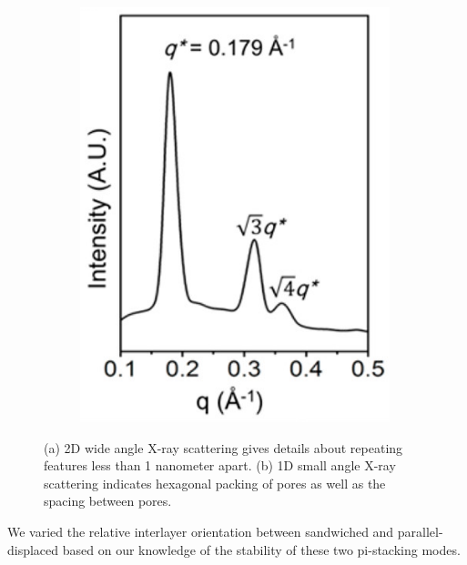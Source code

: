 \documentclass{article}
\begin{document}
\begin{figure}[ht]
\begin{subfigure}[t]{0.43\linewidth}
		\includegraphics[width=\linewidth]{SAXS.png}
		\caption{}\label{fig:SAXS}
	\end{subfigure}
	\caption{(a) 2D wide angle X-ray scattering gives details about repeating
	features less than 1 nanometer apart. (b) 1D small angle X-ray scattering 
	indicates hexagonal packing of pores as well as the spacing between pores.}\label{fig:SWAXS}
  \end{figure}
  
  We varied the relative interlayer orientation between sandwiched and 
  parallel-displaced based on our knowledge of the stability of these two
  pi-stacking modes.
  
\end{document}
